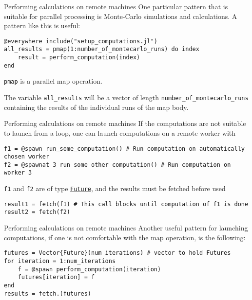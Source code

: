 \documentclass{beamer}
\begin{document}
\begin{frame}[fragile]{Performing calculations on remote machines}
One particular pattern that is suitable for parallel processing is Monte-Carlo simulations and calculations. A pattern like this is useful:
\begin{verbatim}
@everywhere include("setup_computations.jl")
all_results = pmap(1:number_of_montecarlo_runs) do index
    result = perform_computation(index)
end
\end{verbatim}
\verb+pmap+ is a parallel map operation.

The variable \verb+all_results+ will be a vector of length \verb+number_of_montecarlo_runs+ containing the results of the individual runs of the map body.
\end{frame}

\begin{frame}[fragile]{Performing calculations on remote machines}
If the computations are not suitable to launch from a loop, one can launch computations on a remote worker with
\begin{verbatim}
f1 = @spawn run_some_computation() # Run computation on automatically chosen worker
f2 = @spawnat 3 run_some_other_computation() # Run computation on worker 3
\end{verbatim}
\verb+f1+ and \verb+f2+ are of type \href{https://docs.julialang.org/en/v1/manual/parallel-computing/index.html#Multi-Core-or-Distributed-Processing-1}{\texttt{Future}}, and the results must be fetched before used
\begin{verbatim}
result1 = fetch(f1) # This call blocks until computation of f1 is done
result2 = fetch(f2)
\end{verbatim}
\end{frame}


\begin{frame}[fragile]{Performing calculations on remote machines}
Another useful pattern for launching computations, if one is not comfortable with the map operation, is the following:
\begin{verbatim}
futures = Vector{Future}(num_iterations) # vector to hold Futures
for iteration = 1:num_iterations
    f = @spawn perform_computation(iteration)
    futures[iteration] = f
end
results = fetch.(futures)
\end{verbatim}
\end{frame}
\end{document}
